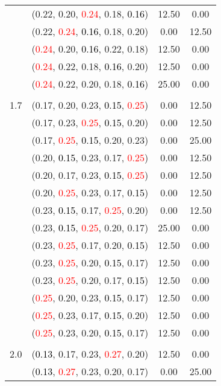 \documentclass[10pt,a4paper]{report}
\begin{document}
\begin{center}
\begin{longtable}{clcc}
			&(0.22, 0.20, \textcolor{red}{0.24}, 0.18, \textcolor{black}{0.16})&12.50&0.00\\
			&(0.22, \textcolor{red}{0.24}, \textcolor{black}{0.16}, 0.18, 0.20)&0.00&12.50\\
			&(\textcolor{red}{0.24}, 0.20, \textcolor{black}{0.16}, 0.22, 0.18)&12.50&0.00\\
			&(\textcolor{red}{0.24}, 0.22, 0.18, \textcolor{black}{0.16}, 0.20)&12.50&0.00\\
			&(\textcolor{red}{0.24}, 0.22, 0.20, 0.18, \textcolor{black}{0.16})&25.00&0.00\\
		&&&\\
		1.7			&(0.17, 0.20, 0.23, \textcolor{black}{0.15}, \textcolor{red}{0.25})&0.00&12.50\\
			&(0.17, 0.23, \textcolor{red}{0.25}, \textcolor{black}{0.15}, 0.20)&0.00&12.50\\
			&(0.17, \textcolor{red}{0.25}, \textcolor{black}{0.15}, 0.20, 0.23)&0.00&25.00\\
			&(0.20, \textcolor{black}{0.15}, 0.23, 0.17, \textcolor{red}{0.25})&0.00&12.50\\
			&(0.20, 0.17, 0.23, \textcolor{black}{0.15}, \textcolor{red}{0.25})&0.00&12.50\\
			&(0.20, \textcolor{red}{0.25}, 0.23, 0.17, \textcolor{black}{0.15})&0.00&12.50\\
			&(0.23, \textcolor{black}{0.15}, 0.17, \textcolor{red}{0.25}, 0.20)&0.00&12.50\\
			&(0.23, \textcolor{black}{0.15}, \textcolor{red}{0.25}, 0.20, 0.17)&25.00&0.00\\
			&(0.23, \textcolor{red}{0.25}, 0.17, 0.20, \textcolor{black}{0.15})&12.50&0.00\\
			&(0.23, \textcolor{red}{0.25}, 0.20, \textcolor{black}{0.15}, 0.17)&12.50&0.00\\
			&(0.23, \textcolor{red}{0.25}, 0.20, 0.17, \textcolor{black}{0.15})&12.50&0.00\\
			&(\textcolor{red}{0.25}, 0.20, 0.23, \textcolor{black}{0.15}, 0.17)&12.50&0.00\\
			&(\textcolor{red}{0.25}, 0.23, 0.17, \textcolor{black}{0.15}, 0.20)&12.50&0.00\\
			&(\textcolor{red}{0.25}, 0.23, 0.20, \textcolor{black}{0.15}, 0.17)&12.50&0.00\\
		&&&\\
		2.0			&(\textcolor{black}{0.13}, 0.17, 0.23, \textcolor{red}{0.27}, 0.20)&12.50&0.00\\
			&(\textcolor{black}{0.13}, \textcolor{red}{0.27}, 0.23, 0.20, 0.17)&0.00&25.00\\

\end{longtable}
\end{center}
\end{document}
